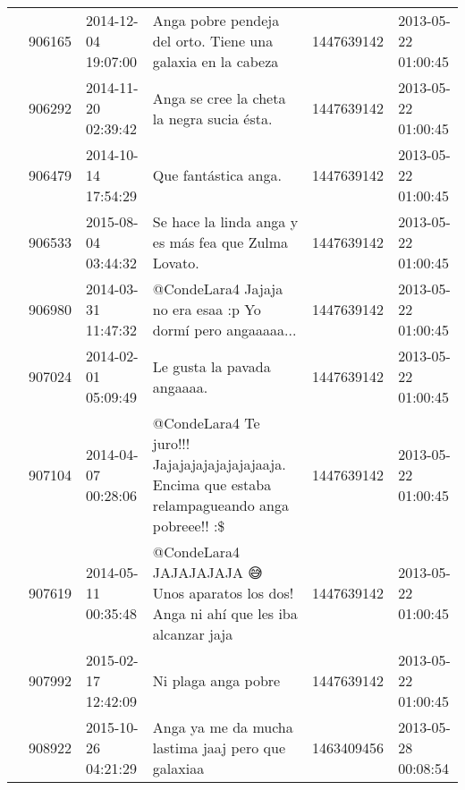 \begin{tabular}{llllrl}
           & 906165  & 2014-12-04 19:07:00 &                                                                                  Anga pobre pendeja del orto. Tiene una galaxia en la cabeza &  1447639142 & 2013-05-22 01:00:45 \\
           & 906292  & 2014-11-20 02:39:42 &                                                                                                   Anga se cree la cheta la negra sucia ésta. &  1447639142 & 2013-05-22 01:00:45 \\
           & 906479  & 2014-10-14 17:54:29 &                                                                                                                         Que fantástica anga. &  1447639142 & 2013-05-22 01:00:45 \\
           & 906533  & 2015-08-04 03:44:32 &                                                                                         Se hace la linda anga y es más fea que Zulma Lovato. &  1447639142 & 2013-05-22 01:00:45 \\
           & 906980  & 2014-03-31 11:47:32 &                                                                                  @CondeLara4 Jajaja no era esaa :p Yo dormí pero angaaaaa... &  1447639142 & 2013-05-22 01:00:45 \\
           & 907024  & 2014-02-01 05:09:49 &                                                                                                                  Le gusta la pavada angaaaa. &  1447639142 & 2013-05-22 01:00:45 \\
           & 907104  & 2014-04-07 00:28:06 &                                             @CondeLara4 Te juro!!! Jajajajajajajajajaaja. Encima que estaba relampagueando anga pobreee!! :\$ &  1447639142 & 2013-05-22 01:00:45 \\
           & 907619  & 2014-05-11 00:35:48 &                                                        @CondeLara4 JAJAJAJAJA 😅 Unos aparatos los dos! Anga ni ahí que les iba alcanzar jaja &  1447639142 & 2013-05-22 01:00:45 \\
           & 907992  & 2015-02-17 12:42:09 &                                                                                                                          Ni plaga anga pobre &  1447639142 & 2013-05-22 01:00:45 \\
           & 908922  & 2015-10-26 04:21:29 &                                                                                           Anga ya me da mucha lastima jaaj pero que galaxiaa &  1463409456 & 2013-05-28 00:08:54 \\

\end{tabular}
